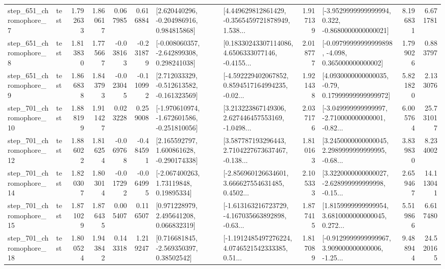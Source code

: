 \begin{tabular}{llrrrrllrlrr}
   step\_651\_chromophore\_7 &      test &      1.792633 &    1.860617 &      0.067985 &  0.616884 &    [2.620440296, -0.204986916, 0.984815868] &  [4.449629812861429, -0.3565459721878949, 1.538... &       1.917139 &  [-3.9529999999999994, 0.322, -0.8680000000000021] &            8.196831 &          6.671781 \\
   step\_651\_chromophore\_8 &      test &      1.813830 &    1.775667 &     -0.038163 & -0.231879 &   [-0.008060357, -2.642899308, 0.298241038] &  [0.18330243307114086, 4.6506333077146, -0.4155... &       2.018777 &  [-0.09799999999999898, -4.098, 0.365000000000002] &            1.799026 &          0.883797 \\
   step\_651\_chromophore\_9 &      test &      1.866838 &    1.843793 &     -0.023045 & -0.110992 &   [2.712033329, -0.512613582, -0.161323569] &  [-4.592229402067852, 0.8594517164994235, -0.02... &       1.921438 &   [4.0930000000000035, -0.79, 0.17999999999999972] &            5.821820 &          2.133076 \\
  step\_701\_chromophore\_10 &      test &      1.888199 &    1.911427 &      0.023228 &  0.259008 &  [-1.970610974, -1.672601586, -0.251810056] &  [3.213223867149306, 2.627446457553169, -1.0498... &       2.037176 &  [-3.049999999999997, -2.710000000000001, -0.82... &            6.005764 &         25.731017 \\
  step\_701\_chromophore\_12 &      test &      1.886022 &    1.816254 &     -0.069768 & -0.484591 &    [2.165592797, 1.600861628, -0.290174338] &  [3.587787193296443, 2.7104227673637467, -0.138... &       1.810163 &  [3.2450000000000045, 2.2989999999999995, -0.68... &            3.839830 &          8.234002 \\
  step\_701\_chromophore\_14 &      test &      1.820307 &    1.803014 &     -0.017292 & -0.064995 &      [-2.067400263, 1.73119848, 0.19895334] &  [-2.856960126634601, 3.666627554631485, 0.4502... &       2.105333 &  [3.3220000000000027, -2.628999999999998, -0.15... &            2.659467 &         14.113041 \\
  step\_701\_chromophore\_15 &      test &      1.871029 &    1.876435 &      0.005407 &  0.116507 &     [0.971228979, 2.495641208, 0.066832319] &  [-1.613163216723729, -4.167035663892898, -0.63... &       1.877415 &  [1.8159999999999954, 3.6810000000000045, 0.272... &            5.519866 &          6.617480 \\
  step\_701\_chromophore\_18 &      test &      1.800524 &    1.943842 &      0.143318 &  1.219247 &     [0.716681845, -2.569350397, 0.38502542] &  [-1.1912485497276224, 4.0746521542333385, 0.51... &       1.817089 &  [-0.9129999999999967, 3.909000000000006, -1.25... &            9.488944 &         24.520165 \\

\end{tabular}
